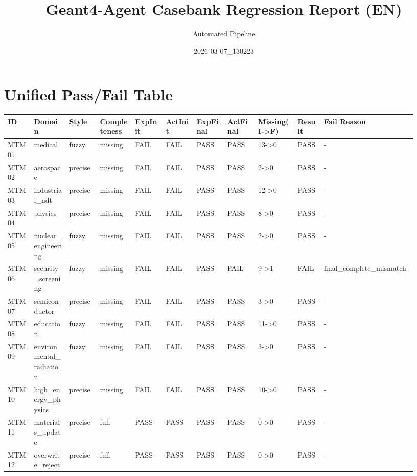 \documentclass[11pt]{ctexart}
\title{Geant4-Agent Casebank Regression Report (EN)}
\author{Automated Pipeline}
\date{2026-03-07\_130223}
\begin{document}
\maketitle
\section{Unified Pass/Fail Table}
\begin{longtable}{p{0.06\linewidth}p{0.08\linewidth}p{0.07\linewidth}p{0.08\linewidth}p{0.07\linewidth}p{0.07\linewidth}p{0.07\linewidth}p{0.07\linewidth}p{0.09\linewidth}p{0.06\linewidth}p{0.21\linewidth}}
\toprule
ID & Domain & Style & Completeness & ExpInit & ActInit & ExpFinal & ActFinal & Missing(I->F) & Result & Fail Reason \\
\midrule
MTM01 & medical & fuzzy & missing & FAIL & FAIL & PASS & PASS & 13->0 & PASS & - \\
MTM02 & aerospace & precise & missing & FAIL & FAIL & PASS & PASS & 2->0 & PASS & - \\
MTM03 & industrial\_ndt & precise & missing & FAIL & FAIL & PASS & PASS & 12->0 & PASS & - \\
MTM04 & physics & precise & missing & FAIL & FAIL & PASS & PASS & 8->0 & PASS & - \\
MTM05 & nuclear\_engineering & fuzzy & missing & FAIL & FAIL & PASS & PASS & 2->0 & PASS & - \\
MTM06 & security\_screening & fuzzy & missing & FAIL & FAIL & PASS & FAIL & 9->1 & FAIL & final\_complete\_mismatch \\
MTM07 & semiconductor & precise & missing & FAIL & FAIL & PASS & PASS & 3->0 & PASS & - \\
MTM08 & education & fuzzy & missing & FAIL & FAIL & PASS & PASS & 11->0 & PASS & - \\
MTM09 & environmental\_radiation & fuzzy & missing & FAIL & FAIL & PASS & PASS & 3->0 & PASS & - \\
MTM10 & high\_energy\_physics & precise & missing & FAIL & FAIL & PASS & PASS & 10->0 & PASS & - \\
MTM11 & materials\_update & precise & full & PASS & PASS & PASS & PASS & 0->0 & PASS & - \\
MTM12 & overwrite\_reject & precise & full & PASS & PASS & PASS & PASS & 0->0 & PASS & - \\
\bottomrule
\end{longtable}
\end{document}
